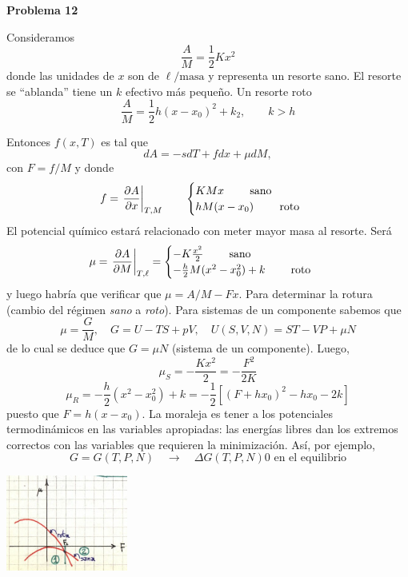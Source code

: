 \documentclass[10pt,oneside]{CBFT_book}
\begin{document}
\begin{ejemplo}{\bf Problema 12}

Consideramos
\[
	\frac A M = \frac{1}{2} K x^2
\]
donde las unidades de $x$ son de $\ell/\text{masa}$ y representa un resorte sano.
El resorte se ``ablanda'' tiene un $k$ efectivo más pequeño.
Un resorte roto
\[
	\frac A M = \frac{1}{2} h( x- x_0 )^2 + k_2, \qquad k > h
\]

Entonces $f(x,T)$ es tal que 
\[
	dA = -s dT + f dx + \mu dM,
\]
con $F= f/M$ y donde 
\[
	f = \left.\frac{\partial^{\hspace{-0.05em}} {A}}{\partial {x}^{\hspace{-0.05em}}}\right|_{T,M} \qquad \begin{cases}
	                              K M x \qquad \text{ sano } \\
	                              h M (x-x_0) \qquad \text{ roto }
	                             \end{cases}
\]
El potencial químico estará relacionado con meter mayor masa al resorte.
Será
\[
	\mu = \left.\frac{\partial^{\hspace{-0.05em}} {A}}{\partial {M}^{\hspace{-0.05em}}}\right|_{T,\ell} = \begin{cases}
	                              - K \frac{x^2}{2} \qquad \text{ sano } \\
	                              - \frac h 2 M ( x^2 - x_0^2 ) + k \qquad \text{ roto }
	                             \end{cases}
\]
y luego habría que verificar que $\mu = A/M - F x$.
Para determinar la rotura (cambio del régimen {\it sano} a {\it roto}).
Para sistemas de un componente sabemos que
\[
	\mu = \frac{G}{M}, 
	\quad G = U - TS + pV, 
	\quad U(S,V,N) = ST - VP + \mu N
\]
de lo cual se deduce que $G=\mu N$ (sistema de un componente). Luego,
\[
	\mu_S = - \frac{Kx^2}{2} = - \frac{F^2}{2K}
\]
\[
	\mu_R = - \frac{h}{2}( x^2 - x_0^2 ) + k = 
	-\frac{1}{2}\left[ (F+h x_0)^2 - hx_0 - 2k \right]
\]
puesto que $F=h(x-x_0)$. La moraleja es tener a los potenciales termodinámicos en las variables
apropiadas: las energías libres dan los extremos correctos con las variables que requieren la
minimización. Así, por ejemplo,
\[
	G = G(T,P,N) \quad \longrightarrow \quad \Delta G(T,P,N)  0 \text{ en el equilibrio}
\]

\includegraphics[width=0.30\textwidth]{images/1606329132.jpg}


\end{ejemplo}
\end{document}
